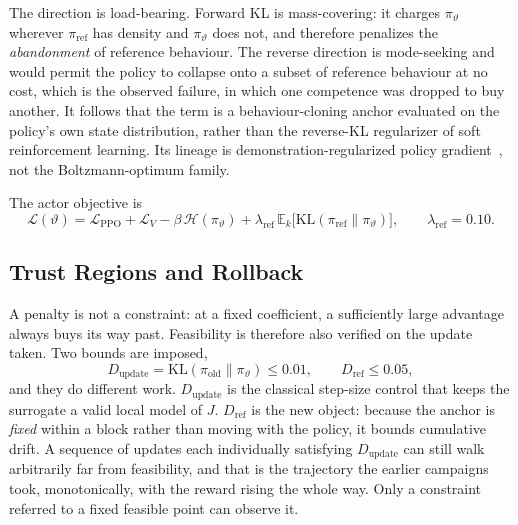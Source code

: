The direction is load-bearing. Forward KL is mass-covering: it charges
$\pi_\vartheta$ wherever $\pi_{\mathrm{ref}}$ has density and $\pi_\vartheta$
does not, and therefore penalizes the \emph{abandonment} of reference
behaviour. The reverse direction is mode-seeking and would permit the policy to
collapse onto a subset of reference behaviour at no cost, which is the observed failure, in which one competence was dropped to buy another. It
follows that the term is a behaviour-cloning anchor evaluated on the policy's
own state distribution, rather than the reverse-KL regularizer of soft
reinforcement learning. Its lineage is demonstration-regularized policy
gradient~\cite{rajeswaran2018dapg}, not the Boltzmann-optimum family.

The actor objective is
%
\begin{equation}
  \label{eq:ctrl:anchored-loss}
  \mathcal{L}(\vartheta)
  = \mathcal{L}_{\mathrm{PPO}}
  + \mathcal{L}_{V}
  - \beta\,\mathcal{H}(\pi_\vartheta)
  + \lambda_{\mathrm{ref}}\,
    \mathbb{E}_k\bigl[\mathrm{KL}(\pi_{\mathrm{ref}} \| \pi_\vartheta)\bigr],
  \qquad
  \lambda_{\mathrm{ref}} = 0.10 .
\end{equation}

\subsection{Trust Regions and Rollback}

A penalty is not a constraint: at a fixed coefficient, a sufficiently large
advantage always buys its way past. Feasibility is therefore also verified on the update taken. Two bounds are imposed,
%
\begin{equation}
  \label{eq:ctrl:bounds}
  D_{\mathrm{update}} = \mathrm{KL}(\pi_{\mathrm{old}} \| \pi_\vartheta)
  \le 0.01,
  \qquad
  D_{\mathrm{ref}} \le 0.05,
\end{equation}
%
and they do different work. $D_{\mathrm{update}}$ is the classical step-size
control that keeps the surrogate a valid local model of $J$.
$D_{\mathrm{ref}}$ is the new object: because the anchor is \emph{fixed} within
a block rather than moving with the policy, it bounds cumulative drift. A
sequence of updates each individually satisfying $D_{\mathrm{update}}$ can
still walk arbitrarily far from feasibility, and that is the trajectory the earlier campaigns took, monotonically, with the reward rising the whole
way. Only a constraint referred to a fixed feasible point can observe it.


